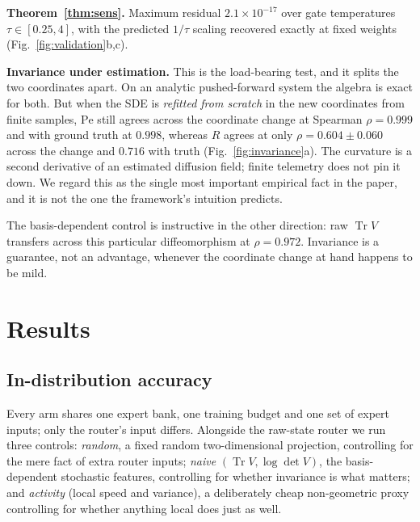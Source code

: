 \documentclass[11pt]{article}
\newcommand{\Pen}{\mathrm{Pe}}
\newcommand{\Trr}{\operatorname{Tr}}
\begin{document}
\textbf{Theorem~\ref{thm:sens}.} Maximum residual $2.1\times10^{-17}$ over gate
temperatures $\tau\in[0.25,4]$, with the predicted $1/\tau$ scaling recovered
exactly at fixed weights (Fig.~\ref{fig:validation}b,c).

\textbf{Invariance under estimation.} This is the load-bearing test, and it
splits the two coordinates apart. On an analytic pushed-forward system the
algebra is exact for both. But when the SDE is \emph{refitted from scratch} in
the new coordinates from finite samples, $\Pen$ still agrees across the
coordinate change at Spearman $\rho=0.999$ and with ground truth at $0.998$,
whereas $R$ agrees at only $\rho=0.604\pm0.060$ across the change and $0.716$
with truth (Fig.~\ref{fig:invariance}a). The curvature is a second derivative
of an estimated diffusion field; finite telemetry does not pin it down. We
regard this as the single most important empirical fact in the paper, and it is
not the one the framework's intuition predicts.

The basis-dependent control is instructive in the other direction: raw
$\Trr V$ transfers across this particular diffeomorphism at $\rho=0.972$.
Invariance is a guarantee, not an advantage, whenever the coordinate change at
hand happens to be mild.

\section{Results}
\label{sec:results}

\subsection{In-distribution accuracy}

Every arm shares one expert bank, one training budget and one set of expert
inputs; only the router's input differs. Alongside the raw-state router we run
three controls: \emph{random}, a fixed random two-dimensional projection,
controlling for the mere fact of extra router inputs; \emph{naive}
$(\Trr V,\log\det V)$, the basis-dependent stochastic features, controlling for
whether invariance is what matters; and \emph{activity} (local speed and
variance), a deliberately cheap non-geometric proxy controlling for whether
anything local does just as well.
\end{document}
